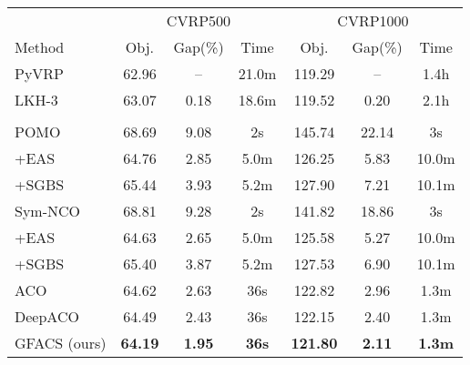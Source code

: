 \documentclass{article}
\begin{document}
\begin{table}[H]
\begin{minipage}[t]{0.495 \textwidth}
\begin{tabular}{l ccc ccc}
\toprule[1pt]
& \multicolumn{3}{c}{CVRP500} & \multicolumn{3}{c}{CVRP1000}\\
\cmidrule(lr){2-4}\cmidrule(lr){5-7}
Method & Obj. & Gap(\%) & Time & Obj. & Gap(\%) & Time \\
\midrule[1pt]
PyVRP              & 62.96 & --    & 21.0m & 119.29 & --   & 1.4h \\
LKH-3              & 63.07 & 0.18  & 18.6m & 119.52 & 0.20 & 2.1h \\
\cmidrule(lr){1-1}\cmidrule(lr){2-4}\cmidrule(lr){5-7}
    &    &   &   &   &   &  \\
POMO               & 68.69 & 9.08  & 2s    & 145.74 & 22.14 & 3s \\
\quad +EAS         & 64.76 & 2.85  & 5.0m  & 126.25 & 5.83  & 10.0m \\
\quad +SGBS        & 65.44 & 3.93  & 5.2m  & 127.90 & 7.21  & 10.1m \\
Sym\mbox{-}NCO     & 68.81 & 9.28  & 2s    & 141.82 & 18.86 & 3s \\
\quad +EAS         & 64.63 & 2.65  & 5.0m  & 125.58 & 5.27  & 10.0m \\
\quad +SGBS        & 65.40 & 3.87  & 5.2m  & 127.53 & 6.90  & 10.1m \\
\cmidrule(lr){1-1}\cmidrule(lr){2-4}\cmidrule(lr){5-7}
ACO                & 64.62 & 2.63 & 36s & 122.82 & 2.96 & 1.3m \\
DeepACO            & 64.49 & 2.43 & 36s & 122.15 & 2.40 & 1.3m \\
GFACS (ours) & \textbf{64.19} & \textbf{1.95} & \textbf{36s} &
\textbf{121.80} & \textbf{2.11} & \textbf{1.3m} \\
\bottomrule[1pt]
\end{tabular}
\end{minipage}
\end{table}
\restoregeometry

\end{document}

